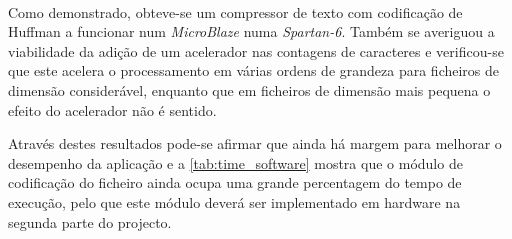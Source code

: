 \paragraph{} Como demonstrado, obteve-se um compressor de texto com codificação de Huffman a funcionar num \textit{MicroBlaze} numa \textit{Spartan-6}. Também se averiguou a viabilidade da adição de um acelerador nas contagens de caracteres e verificou-se que este acelera o processamento em várias ordens de grandeza para ficheiros de dimensão considerável, enquanto que em ficheiros de dimensão mais pequena o efeito do acelerador não é sentido.

Através destes resultados pode-se afirmar que ainda há margem para melhorar o desempenho da aplicação e a \autoref{tab:time_software} mostra que o módulo de codificação do ficheiro ainda ocupa uma grande percentagem do tempo de execução, pelo que este módulo deverá ser implementado em hardware na segunda parte do projecto.
